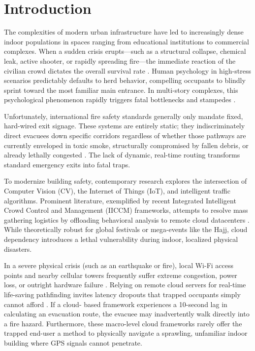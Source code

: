 \documentclass[conference]{IEEEtran}
\begin{document}
\section{Introduction}

The complexities of modern urban infrastructure have led to increasingly dense indoor populations in
spaces ranging from educational institutions to commercial complexes. When a sudden crisis
erupts—such as a structural collapse, chemical leak, active shooter, or rapidly spreading fire—the
immediate reaction of the civilian crowd dictates the overall survival rate \cite{still2000}. Human
psychology in high-stress scenarios predictably defaults to herd behavior, compelling occupants to
blindly sprint toward the most familiar main entrance. In multi-story complexes, this psychological
phenomenon rapidly triggers fatal bottlenecks and stampedes \cite{helbing1995}.

Unfortunately, international fire safety standards generally only mandate fixed, hard-wired exit
signage. These systems are entirely static; they indiscriminately direct evacuees down specific
corridors regardless of whether those pathways are currently enveloped in toxic smoke, structurally
compromised by fallen debris, or already lethally congested \cite{dawidowicz2022}. The lack of
dynamic, real-time routing transforms standard emergency exits into fatal traps.

To modernize building safety, contemporary research explores the intersection of Computer Vision
(CV), the Internet of Things (IoT), and intelligent traffic algorithms. Prominent literature,
exemplified by recent Integrated Intelligent Crowd Control and Management (IICCM) frameworks,
attempts to resolve mass gathering logistics by offloading behavioral analysis to remote cloud
datacenters \cite{alafif2025}. While theoretically robust for global festivals or mega-events like
the Hajj, cloud dependency introduces a lethal vulnerability during indoor, localized physical
disasters.

In a severe physical crisis (such as an earthquake or fire), local Wi-Fi access points and nearby
cellular towers frequently suffer extreme congestion, power loss, or outright hardware failure
\cite{shi2016}. Relying on remote cloud servers for real-time life-saving pathfinding invites
latency dropouts that trapped occupants simply cannot afford \cite{satyanarayanan2017}. If a cloud-
based framework experiences a 10-second lag in calculating an evacuation route, the evacuee may
inadvertently walk directly into a fire hazard. Furthermore, these macro-level cloud frameworks
rarely offer the trapped end-user a method to physically navigate a sprawling, unfamiliar indoor
building where GPS signals cannot penetrate.
\end{document}
